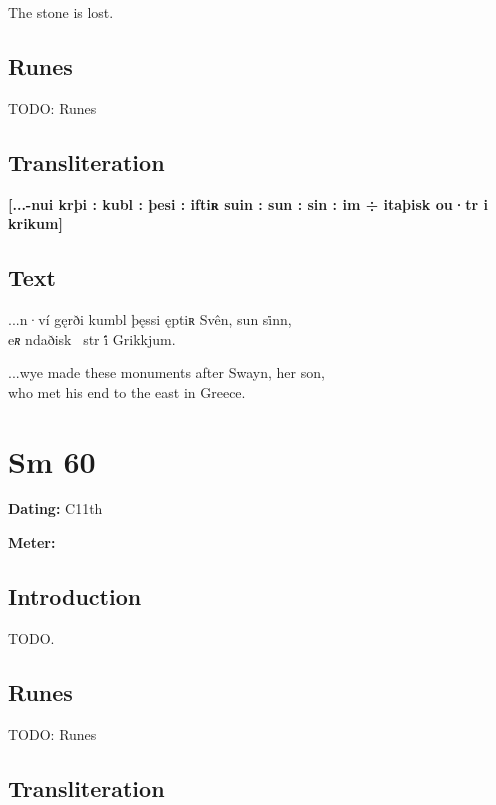 The stone is lost.

\subsection{Runes}

TODO: Runes%

\subsection{Transliteration}

\textbf{[...-nui krþi : kubl : þesi : iftiʀ suin : sun : sin : im ÷ itaþisk ou·tr i krikum]}

\subsection{Text}

\bpg\bpa[0]%
\startsub ...n·ví gęrði kumbl þęssi ęptiʀ Svên, sun si̇nn,\endsub \\
e\emph{ʀ} ndaðisk \hld\ str i̇́ Grikkjum.\epa

\bpb ...wye made these monuments after Swayn, her son, \\
who met his end to the east in Greece.\epb\epg

\sectionline\clearpage


\section{Sm 60}

\begin{flushright}%
\textbf{Dating:} C11th

\textbf{Meter:} \Fornyrdislag
\end{flushright}%

\subsection{Introduction}

TODO.

\subsection{Runes}

TODO: Runes%

\subsection{Transliteration}

